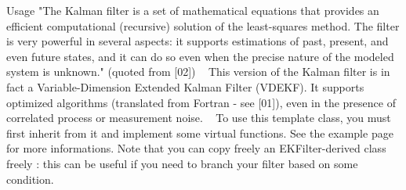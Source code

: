 \begin{DoxyParagraph}{Usage}
"The Kalman filter is a set of mathematical equations that provides an efficient computational (recursive) solution of the least-\/squares method. The filter is very powerful in several aspects\+: it supports estimations of past, present, and even future states, and it can do so even when the precise nature of the modeled system is unknown." (quoted from \mbox{[}02\mbox{]}) ~\newline
 This version of the Kalman filter is in fact a Variable-\/\+Dimension Extended Kalman Filter (V\+D\+E\+KF). It supports optimized algorithms (translated from Fortran -\/ see \mbox{[}01\mbox{]}), even in the presence of correlated process or measurement noise. ~\newline
 To use this template class, you must first inherit from it and implement some virtual functions. See the example page for more informations. Note that you can copy freely an {\ttfamily E\+K\+Filter-\/derived} class freely \+: this can be useful if you need to branch your filter based on some condition.
\end{DoxyParagraph}
